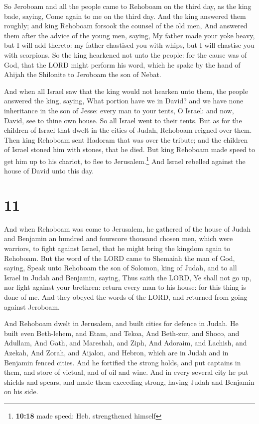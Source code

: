  So Jeroboam and all the people came to Rehoboam on the
third day, as the king bade, saying, Come again to me on the third day.
 And the king answered them roughly; and king Rehoboam
forsook the counsel of the old men,  And answered them
after the advice of the young men, saying, My father made your yoke
heavy, but I will add thereto: my father chastised you with whips, but I
will chastise you with scorpions.  So the king hearkened
not unto the people: for the cause was of God, that the LORD might
perform his word, which he spake by the hand of Ahijah the Shilonite to
Jeroboam the son of Nebat.

 And when all Israel saw that the king would not hearken
unto them, the people answered the king, saying, What portion have we in
David? and we have none inheritance in the son of Jesse: every man to
your tents, O Israel: and now, David, see to thine own house. So all
Israel went to their tents.  But as for the children of
Israel that dwelt in the cities of Judah, Rehoboam reigned over them.
 Then king Rehoboam sent Hadoram that was over the
tribute; and the children of Israel stoned him with stones, that he
died. But king Rehoboam made speed to get him up to his chariot, to flee
to Jerusalem.\footnote{\textbf{10:18} made speed: Heb. strengthened
  himself}  And Israel rebelled against the house of
David unto this day.

\hypertarget{section-10}{%
\section{11}\label{section-10}}

 And when Rehoboam was come to Jerusalem, he gathered of
the house of Judah and Benjamin an hundred and fourscore thousand chosen
men, which were warriors, to fight against Israel, that he might bring
the kingdom again to Rehoboam.  But the word of the LORD
came to Shemaiah the man of God, saying,  Speak unto
Rehoboam the son of Solomon, king of Judah, and to all Israel in Judah
and Benjamin, saying,  Thus saith the LORD, Ye shall not
go up, nor fight against your brethren: return every man to his house:
for this thing is done of me. And they obeyed the words of the LORD, and
returned from going against Jeroboam.

 And Rehoboam dwelt in Jerusalem, and built cities for
defence in Judah.  He built even Beth-lehem, and Etam, and
Tekoa,  And Beth-zur, and Shoco, and Adullam,
 And Gath, and Mareshah, and Ziph,  And
Adoraim, and Lachish, and Azekah,  And Zorah, and
Aijalon, and Hebron, which are in Judah and in Benjamin fenced cities.
 And he fortified the strong holds, and put captains in
them, and store of victual, and of oil and wine.  And in
every several city he put shields and spears, and made them exceeding
strong, having Judah and Benjamin on his side.

